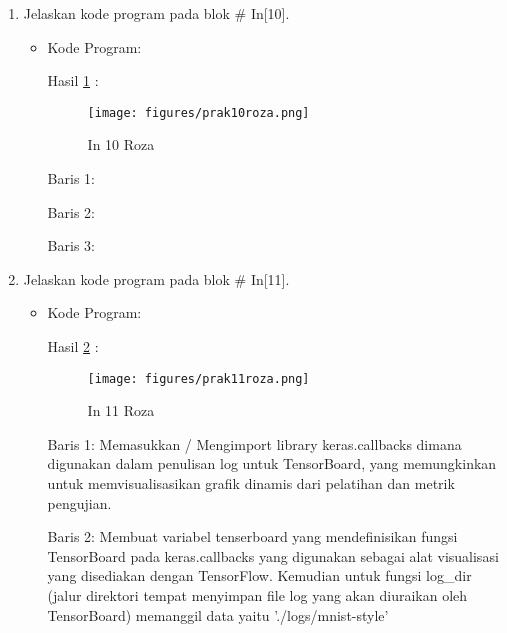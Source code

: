 \begin{enumerate}
\item Jelaskan kode program pada blok \# In[10].
\begin{itemize}
\item Kode Program:

\par Hasil \ref{in10roza} :
\begin{figure}[!hbtp]
\centering
\texttt{[image: figures/prak10roza.png]}
\caption{In 10 Roza}
\label{in10roza}
\end{figure}
\par Baris 1: 
\par Baris 2:
\par Baris 3:
\end{itemize}
\par

\item Jelaskan kode program pada blok \# In[11].
\begin{itemize}
\item Kode Program:

\par Hasil \ref{in11roza} :
\begin{figure}[!hbtp]
\centering
\texttt{[image: figures/prak11roza.png]}
\caption{In 11 Roza}
\label{in11roza}
\end{figure}
\par Baris 1: Memasukkan / Mengimport library keras.callbacks dimana digunakan dalam penulisan log untuk TensorBoard, yang memungkinkan untuk memvisualisasikan grafik dinamis dari pelatihan dan metrik pengujian.
\par Baris 2: Membuat variabel tenserboard yang mendefinisikan fungsi TensorBoard pada keras.callbacks yang digunakan sebagai alat visualisasi yang disediakan dengan TensorFlow. Kemudian untuk fungsi log\_dir (jalur direktori tempat menyimpan file log yang akan diuraikan oleh TensorBoard) memanggil data yaitu './logs/mnist-style'
\end{itemize}
\par


\end{enumerate}
